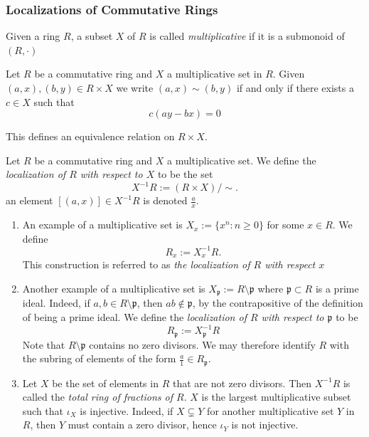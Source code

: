 \subsubsection{Localizations                           of Commutative Rings}
    \begin{definition}
        Given a ring $R$, a subset $X$ of $R$ is called \emph{multiplicative} if it is a submonoid of $(R,\cdot)$ 
    \end{definition}
    \begin{definition}
        Let $R$ be a commutative ring and $X$ a multiplicative set in $R$. Given $(a,x),(b,y)\in R\times X$ we write $(a,x)\sim (b,y)$ if and only if there exists a $c\in X$ such that 
        $$
            c(ay-bx)=0
        $$
    \end{definition}
    \begin{remark}
        This defines an equivalence relation on $R\times X$.
    \end{remark}
    \begin{definition}
        Let $R$ be a commutative ring and $X$ a multiplicative set. We define the \emph{localization of $R$ with respect to $X$} to be the set 
        $$
            X^{-1}R := (R\times X)/\sim. 
        $$
        an element $[(a,x)]\in X^{-1}R$ is denoted $\frac{a}{x}$.
    \end{definition}
    \begin{example}
        \begin{enumerate}
            \item  An example of a multiplicative set is $X_x:=\{x^n : n\geq 0\}$ for some $x\in R$. We define
            $$
                R_x := X_x^{-1}R.
            $$
            This construction is referred to as \emph{the localization of $R$ with respect $x$}
            \item Another example of a multiplicative set is $X_\mathfrak{p}:= R\setminus \mathfrak{p}$ where $\mathfrak{p}\subset R $ is a prime ideal. Indeed, if $a,b\in R\setminus \mathfrak{p}$, then $ab\notin \mathfrak{p}$, by the contrapositive of the definition of being a prime ideal. We define the \emph{localization of $R$ with respect to $\mathfrak{p}$} to be 
            $$
                R_\mathfrak{p} := X_\mathfrak{p}^{-1}R
            $$
            Note that $R\setminus\mathfrak{p}$ contains no zero divisors. We may therefore identify $R$ with the subring of elements of the form $\frac{a}{1}\in R_\mathfrak{p}$.
            \item Let $X$ be the set of elements in $R$ that are not zero divisors. Then $X^{-1}R$ is called the \emph{total ring of fractions of $R$}. $X$ is the largest multiplicative subset such that $\iota_X$ is injective. Indeed, if $X\subsetneq Y$ for another multiplicative set $Y$ in $R$, then $Y$ must contain a zero divisor, hence $\iota_Y$ is not injective.
        \end{enumerate}
    \end{example}
